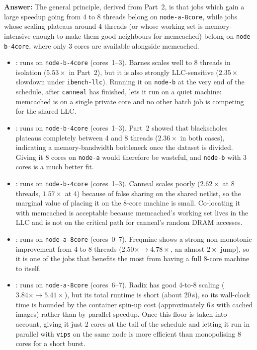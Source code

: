 \begin{enumerate}
\begin{enumerate}
\begin{itemize}
        \textbf{Answer:}
        The general principle, derived from Part~2, is that jobs which gain a large speedup going from 4 to 8 threads belong on \texttt{node-a-8core}, while jobs whose scaling plateaus around 4 threads (or whose working set is memory-intensive enough to make them good neighbours for memcached) belong on \texttt{node-b-4core}, where only 3 cores are available alongside memcached.

        \begin{itemize}
            \item {}: runs on \texttt{node-b-4core} (cores~1--3). Barnes scales well to 8 threads in isolation ($5.53\times$ in Part~2), but it is also strongly LLC-sensitive ($2.35\times$ slowdown under \texttt{ibench-llc}). Running it on \texttt{node-b} at the very end of the schedule, after \texttt{canneal} has finished, lets it run on a quiet machine: memcached is on a single private core and no other batch job is competing for the shared LLC.

            \item {}: runs on \texttt{node-b-4core} (cores~1--3). Part~2 showed that blackscholes plateaus completely between 4 and 8 threads ($2.36\times$ in both cases), indicating a memory-bandwidth bottleneck once the dataset is divided. Giving it 8 cores on \texttt{node-a} would therefore be wasteful, and \texttt{node-b} with 3 cores is a much better fit.

            \item {}: runs on \texttt{node-b-4core} (cores~1--3). Canneal scales poorly ($2.62\times$ at 8 threads, $1.57\times$ at 4) because of false sharing on the shared netlist, so the marginal value of placing it on the 8-core machine is small. Co-locating it with memcached is acceptable because memcached's working set lives in the LLC and is not on the critical path for canneal's random DRAM accesses.

            \item {}: runs on \texttt{node-a-8core} (cores~0--7). Freqmine shows a strong non-monotonic improvement from 4 to 8 threads ($2.50\times \rightarrow 4.78\times$, an almost $2\times$ jump), so it is one of the jobs that benefits the most from having a full 8-core machine to itself.

            \item {}: runs on \texttt{node-a-8core} (cores~6--7). Radix has good 4-to-8 scaling ($3.84\times \rightarrow 5.41\times$), but its total runtime is short (about 20\,s), so its wall-clock time is bounded by the container spin-up cost (approximately 6\,s with cached images) rather than by parallel speedup. Once this floor is taken into account, giving it just 2 cores at the tail of the schedule and letting it run in parallel with \texttt{vips} on the same node is more efficient than monopolising 8 cores for a short burst.


\end{itemize}
\end{itemize}
\end{enumerate}
\end{enumerate}
